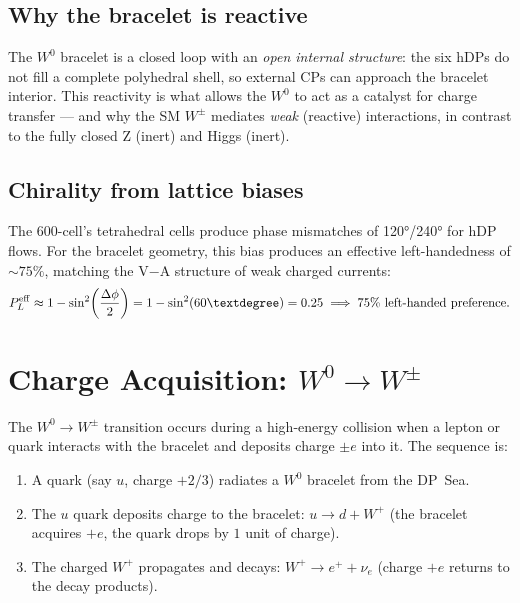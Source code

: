 \documentclass[11pt,letterpaper]{article}
\begin{document}
\subsection{Why the bracelet is reactive}

The $W^0$ bracelet is a closed loop with an \emph{open internal
structure}: the six hDPs do not fill a complete polyhedral shell, so
external CPs can approach the bracelet interior.  This reactivity is
what allows the $W^0$ to act as a catalyst for charge transfer ---
and why the SM $W^\pm$ mediates \emph{weak} (reactive) interactions,
in contrast to the fully closed Z (inert) and Higgs (inert).

\subsection{Chirality from lattice biases}

The 600-cell's tetrahedral cells produce phase mismatches of
120°/240° for hDP flows.  For the bracelet geometry, this bias
produces an effective left-handedness of $\sim75\%$, matching the
V$-$A structure of weak charged currents:
\begin{equation}
P_L^{\rm eff} \approx 1 - \sin^2\!\left(\frac{\Delta\phi}{2}\right)
= 1 - \sin^2(60°) = 0.25 \implies 75\%\ \text{left-handed preference}.
\end{equation}

\section{Charge Acquisition: $W^0 \to W^\pm$}

The $W^0 \to W^\pm$ transition occurs during a high-energy collision
when a lepton or quark interacts with the bracelet and deposits
charge $\pm e$ into it.  The sequence is:

\begin{enumerate}
\item A quark (say $u$, charge $+2/3$) radiates a $W^0$ bracelet
  from the DP~Sea.
\item The $u$ quark deposits charge to the bracelet:
  $u \to d + W^+$ (the bracelet acquires $+e$, the quark drops by $1$
  unit of charge).
\item The charged $W^+$ propagates and decays:
  $W^+ \to e^+ + \nu_e$ (charge $+e$ returns to the decay products).
\end{enumerate}
\end{document}
